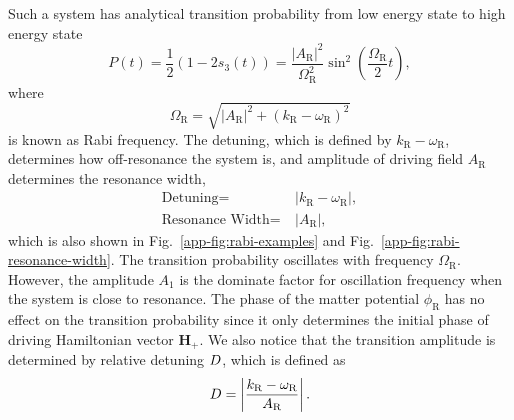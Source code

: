Such a system has analytical transition probability from low energy state to high energy state
\begin{equation}
    P(t) = \frac{1}{2}(1- 2 s_3(t))= \frac{\left \lvert A_{\mathrm{R}} \right \rvert ^2}{ \Omega_{\mathrm R}^2 } \sin^2 \left( \frac{\Omega_{\mathrm R}}{2} t \right),
    \label{rabi-system-transition-probability}
\end{equation}
where
\begin{equation}
\Omega_{\mathrm R} = \sqrt{ \lvert A_{\mathrm{R}}\rvert^2 + (k_{\mathrm{R}} - \omega_{\mathrm R})^2 }
\end{equation} is known as Rabi frequency. The detuning, which is defined by $k_{\mathrm{R}} - \omega_{\mathrm R}$, determines how off-resonance the system is, and amplitude of driving field $A_{\mathrm{R}}$ determines the resonance width,
\begin{align}
\text{Detuning} =&~\lvert k_{\mathrm{R}} - \omega_{\mathrm R} \rvert, \\
\text{Resonance Width} =&~\lvert A_{\mathrm R} \rvert,
\end{align}
which is also shown in Fig.~\ref{app-fig:rabi-examples} and Fig.~\ref{app-fig:rabi-resonance-width}. The transition probability oscillates with frequency $\Omega_{\mathrm R}$. However, the amplitude $A_1$ is the dominate factor for oscillation frequency when the system is close to resonance. The phase of the matter potential $\phi_{\mathrm{R}}$ has no effect on the transition probability since it only determines the initial phase of driving Hamiltonian vector $\mathbf{H}_+$. We also notice that the transition amplitude is determined by relative detuning $D$, which is defined as
\begin{equation}
    D = \left\lvert \frac{ k_{\mathrm R} - \omega_{\mathrm R}}{A_{\mathrm R}} \right\rvert.
\end{equation}


